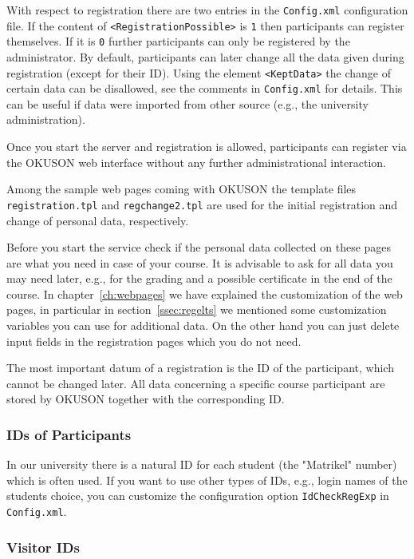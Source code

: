 \documentclass[12pt,openany,a4paper]{book}
\newcommand{\OKUSON}{\textsf{OKUSON}}
\begin{document}
With respect to registration there are two entries in the 
\texttt{Config.xml} configuration
file. If the content of \verb!<RegistrationPossible>! is \texttt{1} then
participants can register themselves. If it is \texttt{0} 
further participants can only be registered by the administrator.
By default, participants can later change all the data given during
registration (except for their ID). Using the element
\verb!<KeptData>! the change of certain data
can be disallowed, see the comments in \texttt{Config.xml} for details.
This can be useful if data were imported from other source (e.g.,
the university administration).

Once you start the server and registration is allowed, participants 
can register via the {\OKUSON} web 
interface without  any further administrational interaction. 

Among the sample web pages coming with {\OKUSON} the template files
\texttt{registration.tpl} and \texttt{regchange2.tpl} are used for the
initial registration and change of personal data, respectively. 

Before you start the service check if the personal data collected on these
pages are what you need in case of your course. It is advisable to ask for
all data you may need later, e.g., for the grading and a possible
certificate in the end of the course. In chapter~\ref{ch:webpages} we have
explained the customization of the web pages, in particular in
section~\ref{ssec:regelts} we mentioned some customization variables you can
use for additional data. On the other hand you can just delete input fields 
in the registration pages which you do not need.

The most important datum of a registration is the ID of the participant,
which cannot be changed later. All data concerning a specific course
participant are stored by {\OKUSON} together with the corresponding ID.


\subsubsection*{IDs of Participants}

In our university there is a natural ID for each student (the "Matrikel" 
number)  which is often used. If you want to use other types of IDs, e.g.,
login names of the students choice, you can customize  the configuration option
\texttt{IdCheckRegExp} in \texttt{Config.xml}.

\subsubsection*{Visitor IDs}
\end{document}
